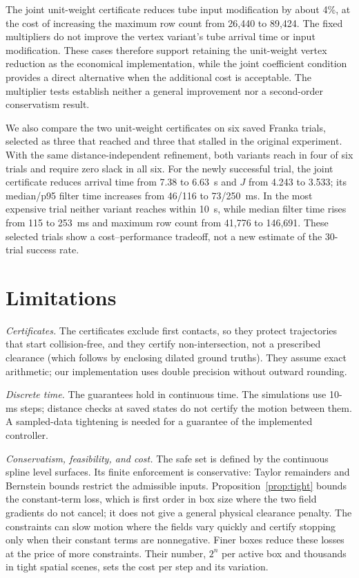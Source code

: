 \documentclass[journal]{IEEEtran}
\theoremstyle{definition}
\begin{document}
The joint unit-weight certificate reduces tube input modification by about 4\%, at the cost
of increasing the maximum row count from 26{,}440 to 89{,}424. The fixed multipliers do not
improve the vertex variant's tube arrival time or input modification. These cases therefore
support retaining the unit-weight vertex reduction as the economical implementation, while
the joint coefficient condition provides a direct alternative when the additional cost is
acceptable. The multiplier tests establish neither a general improvement nor a second-order
conservatism result.

We also compare the two unit-weight certificates on six saved Franka trials, selected as three
that reached and three that stalled in the original experiment. With the same distance-independent
refinement, both variants reach in four of six trials and require zero slack in all six.
For the newly successful trial, the joint certificate reduces arrival time from 7.38 to 6.63~s
and $J$ from 4.243 to 3.533; its median/p95 filter time increases from 46/116 to 73/250~ms.
In the most expensive trial neither variant reaches within 10~s, while median filter time rises
from 115 to 253~ms and maximum row count from 41{,}776 to 146{,}691. These selected trials
show a cost--performance tradeoff, not a new estimate of the 30-trial success rate.

\section{Limitations}\label{sec:limits}
\emph{Certificates.} The certificates exclude first contacts, so they protect trajectories that
start collision-free, and they certify non-intersection, not a prescribed clearance (which follows
by enclosing dilated ground truths). They assume exact arithmetic; our implementation uses double
precision without outward rounding.

\emph{Discrete time.} The guarantees hold in continuous time. The simulations use 10-ms steps;
distance checks at saved states do not certify the motion between them. A sampled-data tightening
is needed for a guarantee of the implemented controller.

\emph{Conservatism, feasibility, and cost.} The safe set is defined by the continuous spline level
surfaces. Its finite enforcement is conservative: Taylor remainders and Bernstein bounds restrict
the admissible inputs. Proposition~\ref{prop:tight} bounds the constant-term loss, which is first
order in box size where the two field gradients do not cancel; it does not give a general physical
clearance penalty. The constraints can slow motion where the fields vary quickly and certify
stopping only when their constant terms are nonnegative. Finer boxes reduce these losses at the
price of more constraints. Their number,
$2^n$ per active box and thousands in tight spatial scenes, sets the cost per step and its
variation.
\end{document}
